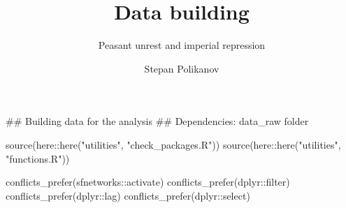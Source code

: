 \documentclass[
  9pt,
  letterpaper,
  DIV=11,
  numbers=noendperiod]{scrartcl}
\title{Data building}
\subtitle{Peasant unrest and imperial repression}
\author{Stepan Polikanov}
\date{}
\newenvironment{Shaded}{\begin{snugshade}}{\end{snugshade}}
\newcommand{\DocumentationTok}[1]{\textcolor[rgb]{0.64,0.20,0.25}{#1}}
\newcommand{\FunctionTok}[1]{\textcolor[rgb]{0.56,0.27,0.68}{#1}}
\newcommand{\NormalTok}[1]{\textcolor[rgb]{0.81,0.81,0.76}{#1}}
\newcommand{\SpecialCharTok}[1]{\textcolor[rgb]{0.24,0.68,0.91}{#1}}
\newcommand{\StringTok}[1]{\textcolor[rgb]{0.96,0.31,0.31}{#1}}
\begin{document}
\maketitle


\begin{Shaded}
\begin{Highlighting}[]
\DocumentationTok{\#\# Building data for the analysis}
\DocumentationTok{\#\# Dependencies: data\_raw folder}

\FunctionTok{source}\NormalTok{(here}\SpecialCharTok{::}\FunctionTok{here}\NormalTok{(}\StringTok{"utilities"}\NormalTok{, }\StringTok{"check\_packages.R"}\NormalTok{))}
\FunctionTok{source}\NormalTok{(here}\SpecialCharTok{::}\FunctionTok{here}\NormalTok{(}\StringTok{"utilities"}\NormalTok{, }\StringTok{"functions.R"}\NormalTok{))}

\FunctionTok{conflicts\_prefer}\NormalTok{(sfnetworks}\SpecialCharTok{::}\NormalTok{activate)}
\FunctionTok{conflicts\_prefer}\NormalTok{(dplyr}\SpecialCharTok{::}\NormalTok{filter)}
\FunctionTok{conflicts\_prefer}\NormalTok{(dplyr}\SpecialCharTok{::}\NormalTok{lag)}
\FunctionTok{conflicts\_prefer}\NormalTok{(dplyr}\SpecialCharTok{::}\NormalTok{select)}
\end{Highlighting}
\end{Shaded}
\end{document}
